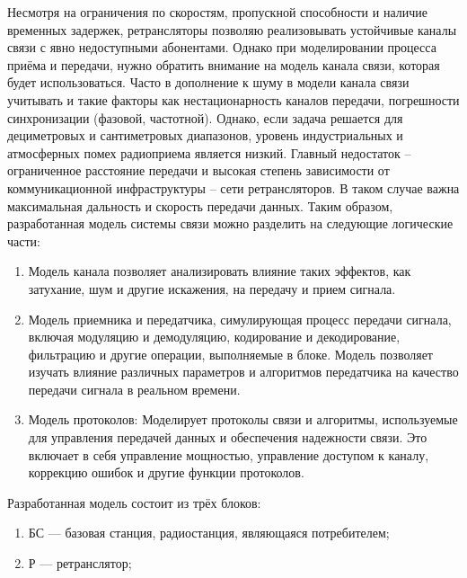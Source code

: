 \begin{onehalfspace}

 
	Несмотря на ограничения по скоростям, пропускной способности и наличие временных задержек, ретрансляторы позволяю реализовывать устойчивые каналы связи с явно недоступными абонентами. Однако при моделировании процесса приёма и передачи, нужно обратить внимание на модель канала связи, которая будет использоваться. Часто в дополнение к шуму в модели канала связи учитывать и такие факторы как нестационарность каналов передачи, погрешности синхронизации (фазовой, частотной). Однако, если задача решается для дециметровых и сантиметровых диапазонов, уровень индустриальных и атмосферных помех радиоприема является низкий. Главный недостаток – ограниченное расстояние передачи и высокая степень зависимости от коммуникационной инфраструктуры – сети ретрансляторов. В таком случае важна максимальная дальность и скорость передачи данных. Таким образом, разработанная модель системы связи можно разделить на следующие логические части:

 \begin{enumerate} 

\item Модель канала позволяет анализировать влияние таких эффектов, как затухание, шум и другие искажения, на передачу и прием сигнала.

\item Модель приемника и передатчика, симулирующая процесс передачи сигнала, включая модуляцию и демодуляцию, кодирование и декодирование, фильтрацию и другие операции, выполняемые в блоке.  Модель позволяет изучать влияние различных параметров и алгоритмов передатчика на качество передачи сигнала в реальном времени.


\item Модель протоколов: Моделирует протоколы связи и алгоритмы, используемые для управления передачей данных и обеспечения надежности связи. Это включает в себя управление мощностью, управление доступом к каналу, коррекцию ошибок и другие функции протоколов.
\end{enumerate} 



  Разработанная модель состоит из трёх блоков:

 
	\begin{enumerate} 	
		\item БС — базовая станция, радиостанция, являющаяся потребителем; 
		
		\item Р — ретранслятор;
		

\end{enumerate}
\end{onehalfspace}
